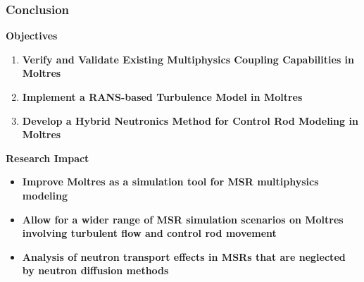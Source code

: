 \begin{frame}
  \frametitle{Conclusion}
  \begin{block}{\textbf{Objectives}}
    \begin{enumerate}
      \item \textbf{Verify and Validate Existing Multiphysics Coupling Capabilities in Moltres}
      \item \textbf{Implement a RANS-based Turbulence Model in Moltres}
      \item \textbf{Develop a Hybrid Neutronics Method for Control Rod Modeling in Moltres}
    \end{enumerate}
  \end{block}
  \begin{block}{\textbf{Research Impact}}
    \begin{itemize}
      \item \textbf{Improve Moltres as a simulation tool for MSR multiphysics modeling}
      \item \textbf{Allow for a wider range of MSR simulation scenarios on Moltres involving
        turbulent flow and control rod movement}
      \item \textbf{Analysis of neutron transport effects in MSRs that are neglected by neutron
        diffusion methods}
    \end{itemize}
  \end{block}
\end{frame}
